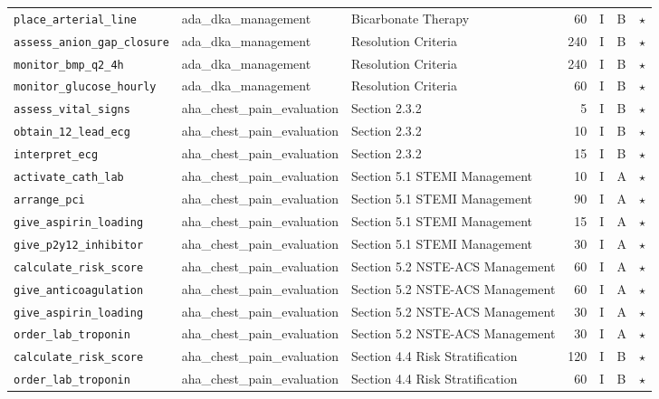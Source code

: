 \begin{longtable}{lllrcll}
\texttt{place\_arterial\_line} & ada\_dka\_management & Bicarbonate Therapy & 60 & I & B & $\star$ \\
\texttt{assess\_anion\_gap\_closure} & ada\_dka\_management & Resolution Criteria & 240 & I & B & $\star$ \\
\texttt{monitor\_bmp\_q2\_4h} & ada\_dka\_management & Resolution Criteria & 240 & I & B & $\star$ \\
\texttt{monitor\_glucose\_hourly} & ada\_dka\_management & Resolution Criteria & 60 & I & B & $\star$ \\
\texttt{assess\_vital\_signs} & aha\_chest\_pain\_evaluation & Section 2.3.2 & 5 & I & B & $\star$ \\
\texttt{obtain\_12\_lead\_ecg} & aha\_chest\_pain\_evaluation & Section 2.3.2 & 10 & I & B & $\star$ \\
\texttt{interpret\_ecg} & aha\_chest\_pain\_evaluation & Section 2.3.2 & 15 & I & B & $\star$ \\
\texttt{activate\_cath\_lab} & aha\_chest\_pain\_evaluation & Section 5.1 STEMI Management & 10 & I & A & $\star$ \\
\texttt{arrange\_pci} & aha\_chest\_pain\_evaluation & Section 5.1 STEMI Management & 90 & I & A & $\star$ \\
\texttt{give\_aspirin\_loading} & aha\_chest\_pain\_evaluation & Section 5.1 STEMI Management & 15 & I & A & $\star$ \\
\texttt{give\_p2y12\_inhibitor} & aha\_chest\_pain\_evaluation & Section 5.1 STEMI Management & 30 & I & A & $\star$ \\
\texttt{calculate\_risk\_score} & aha\_chest\_pain\_evaluation & Section 5.2 NSTE-ACS Management & 60 & I & A & $\star$ \\
\texttt{give\_anticoagulation} & aha\_chest\_pain\_evaluation & Section 5.2 NSTE-ACS Management & 60 & I & A & $\star$ \\
\texttt{give\_aspirin\_loading} & aha\_chest\_pain\_evaluation & Section 5.2 NSTE-ACS Management & 30 & I & A & $\star$ \\
\texttt{order\_lab\_troponin} & aha\_chest\_pain\_evaluation & Section 5.2 NSTE-ACS Management & 30 & I & A & $\star$ \\
\texttt{calculate\_risk\_score} & aha\_chest\_pain\_evaluation & Section 4.4 Risk Stratification & 120 & I & B & $\star$ \\
\texttt{order\_lab\_troponin} & aha\_chest\_pain\_evaluation & Section 4.4 Risk Stratification & 60 & I & B & $\star$ \\

\end{longtable}

